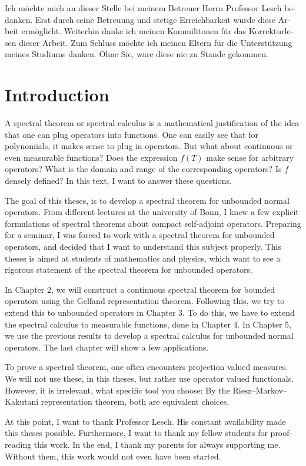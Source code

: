 \begin{otherlanguage}{ngerman}
Ich möchte mich an dieser Stelle bei meinem Betreuer Herrn Professor Lesch bedanken.
Erst durch seine Betreuung und stetige Erreichbarkeit wurde diese Arbeit ermöglicht.
Weiterhin danke ich meinen Kommilitonen für das Korrekturlesen dieser Arbeit. 
Zum Schluss möchte ich meinen Eltern für die Unterstützung meines Studiums danken.
Ohne Sie, wäre diese nie zu Stande gekommen.


\end{otherlanguage}

\newpage
\section*{Introduction}
A spectral theorem or spectral calculus is a mathematical justification 
of the idea that one can plug operators into functions. One can easily see
that for polynomials, it makes sense to plug in operators. But what about
continuous or even measurable functions? Does the expression $f(T)$ make 
sense for arbitrary operators? What is the domain and range of the corresponding
operators? Is $f$ densely defined? In this text, I want to answer these questions.

The goal of this theses, is to develop a spectral theorem for unbounded normal
operators. From different lectures at the university of Bonn, I knew a few explicit
formulations of spectral theorems about compact self-adjoint operators. Preparing
for a seminar, I was forced to work with a spectral theorem for unbounded operators, 
and decided that I want to understand this subject properly. This theses is aimed
at students of mathematics and physics, which want to see a rigorous statement
of the spectral theorem for unbounded operators.

In Chapter 2, we will construct a continuous spectral theorem for bounded operators
using the Gelfand representation theorem. Following this, we try to extend this to unbounded
operators in Chapter 3. To do this, we have to extend the spectral calculus to measurable
functions, done in Chapter 4. In Chapter 5, we use the previous results to develop a spectral
calculus for unbounded normal operators. The last chapter will show a few applications.

To prove a spectral theorem, one often encounters projection valued measures. We will not 
use these, in this theses, but rather use operator valued functionals.
However, it is irrelevant, what specific tool you choose:
By the Riesz--Markov--Kakutani representation theorem, both are equivalent choices.

At this point, I want to thank Professor Lesch. His constant availability made this theses possible.
Furthermore, I want to thank my fellow students for proof-reading this work. In the end, I thank
my parents for always supporting me. Without them, this work would not even have been started.



